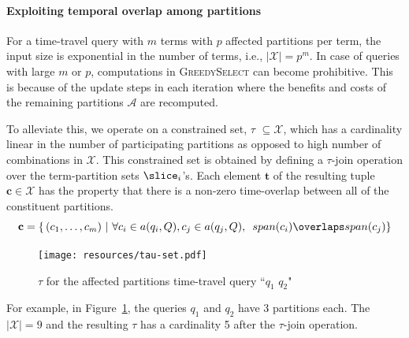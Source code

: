 \paragraph{Exploiting temporal overlap among partitions}

For a time-travel query with $m$ terms with $p$ affected partitions per term, the input size is exponential in the number of terms, i.e., $|\mathcal{X}| = p^m$. In case of queries with large $m$ or $p$, computations in \textsc{GreedySelect} can become prohibitive. This is because of the update steps in each iteration where the benefits and costs of the remaining partitions $\mathcal{A}$ are recomputed.

To alleviate this, we operate on a constrained set, $\tau$  $\subseteq \mathcal{X}$, which has a cardinality linear in the number of participating partitions as opposed to high number of combinations in $\mathcal{X}$. This constrained set is obtained by defining a $\tau$-join operation over the term-partition sets $\slice_i$'s. Each element $\mathbf{t}$ of the resulting tuple $\mathbf{c} \in \mathcal{X}$ has
the property that there is a non-zero time-overlap between all of the
constituent partitions.
$$
\mathbf{c} = \{ \, ( c_1, \ldots, c_m ) ~|~ \forall c_i \in a(q_i, Q),c_j \in a(q_j, Q), \,\,\,span(c_i) \overlaps span(c_j) \}
$$
\begin{figure}[tb]
\centering
  \texttt{[image: resources/tau-set.pdf]}
  \caption{$\tau$ for the affected partitions time-travel query
    ``$q_1 \,\, q_2$"}
  \label{fig:tauset}
\end{figure}

For example, in Figure~\ref{fig:tauset}, the queries $q_1$ and $q_2$ have 3 partitions each. The $|\mathcal{X}| = 9$ and the resulting  $\tau$ has a cardinality 5 after the  $\tau$-join operation.



